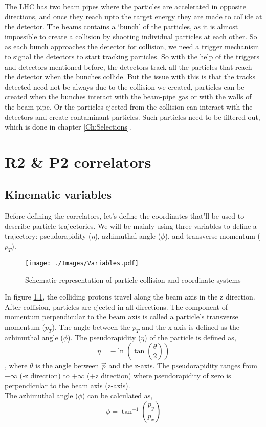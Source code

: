 \documentclass[12pt,a4paper,twoside]{report}
\begin{document}
The LHC has two beam pipes where the particles are accelerated in opposite directions, and once they reach upto the target energy they are made to collide at the detector. The beams contains a `bunch' of the particles, as it is almost impossible to create a collision by shooting individual particles at each other. So as each bunch approaches the detector for collision, we need a trigger mechanism to signal the detectors to start tracking particles. So with the help  of the triggers and detectors mentioned before, the detectors track all the particles that reach the detector when the bunches collide. But the issue with this is that the tracks detected need not be always due to the collision we created, particles can be created when the bunches interact with the beam-pipe gas or with the walls of the beam pipe. Or the particles ejected from the collision can interact with the detectors and create contaminant particles. Such particles need to be filtered out, which is done in chapter \ref{Ch:Selections}.
\chapter{R2 \& P2 correlators}\label{Ch:R2P2}
\section{Kinematic variables}
Before defining the correlators, let's define the coordinates that'll be used to describe particle trajectories. We will be mainly using three variables to define a trajectory: pseudorapidity ($\eta$), azhimuthal angle ($\phi$), and transverse momentum ($p_T$).\\
\begin{figure}[H]
	\texttt{[image: ./Images/Variables.pdf]}
	\caption{Schematic representation of particle collision and coordinate systems}
	\label{fig:Variables}
\end{figure}
In figure \ref{fig:Variables}, the colliding protons travel along the beam axis in the z direction. After collision, particles are ejected in all directions. The component of momentum perpendicular to the beam axis is called a particle's transverse momentum ($p_T$). The angle between the $p_T$ and the x axis is defined as the azhimuthal angle ($\phi$). The pseudorapidity ($\eta$) of the particle is defined as,
\[\eta=-\ln\left(\tan\left(\frac{\theta}{2}\right)\right)\]
, where $\theta$ is the angle between $\vec{p}$ and the z-axis. The pseudorapidity ranges from $-\infty$ (-z direction) to $+\infty$ (+z direction) where pseudorapidity of zero is perpendicular to the beam axis (z-axis).\\
The azhimuthal angle ($\phi$) can be calculated as,
\[\phi=\tan^{-1}\left(\frac{p_y}{p_x}\right)\]
\end{document}
